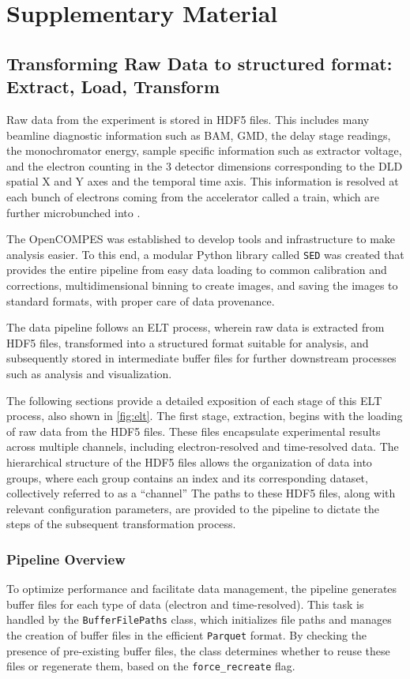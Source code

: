 \chapter{Supplementary Material}
\section{Transforming Raw Data to structured format: Extract, Load, Transform}\label{sec:elt}
Raw data from the experiment is stored in \gls{HDF5} files. This includes many \gls{beamline} diagnostic information such as \gls{BAM}, \gls{GMD}, the delay stage readings, the monochromator energy, sample specific information such as extractor voltage, and the electron counting in the 3 detector dimensions corresponding to the \gls{DLD} spatial X and Y axes and the temporal time axis. This information is resolved at each bunch of electrons coming from the accelerator called a \gls{train}, which are further microbunched into .

The \gls{OpenCOMPES} was established to develop tools and infrastructure to make analysis easier. To this end, a modular Python library called \texttt{\gls{SED}} was created that provides the entire pipeline from easy data loading to common calibration and corrections, multidimensional binning to create images, and saving the images to standard formats, with proper care of data provenance.

The data pipeline follows an \gls{ELT} process, wherein raw data is extracted from \gls{HDF5} files, transformed into a structured format suitable for analysis, and subsequently stored in intermediate buffer files for further downstream processes such as analysis and visualization.

The following sections provide a detailed exposition of each stage of this \gls{ELT} process, also shown in \cref{fig:elt}. The first stage, extraction, begins with the loading of raw data from the \gls{HDF5} files. These files encapsulate experimental results across multiple channels, including electron-resolved and time-resolved data. The hierarchical structure of the \gls{HDF5} files allows the organization of data into groups, where each group contains an index and its corresponding dataset, collectively referred to as a “channel” The paths to these \gls{HDF5} files, along with relevant configuration parameters, are provided to the pipeline to dictate the steps of the subsequent transformation process.

\subsection*{Pipeline Overview}
To optimize performance and facilitate data management, the pipeline generates buffer files for each type of data (electron and time-resolved). This task is handled by the \texttt{BufferFilePaths} class, which initializes file paths and manages the creation of buffer files in the efficient \texttt{Parquet} format. By checking the presence of pre-existing buffer files, the class determines whether to reuse these files or regenerate them, based on the \texttt{force\_recreate} flag.

